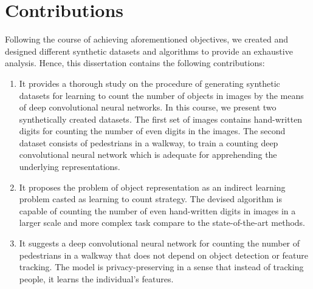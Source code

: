 \section{Contributions}
Following the course of achieving aforementioned objectives, we created and designed different synthetic datasets and algorithms to provide an exhaustive analysis. Hence, this dissertation contains the following contributions: 

\begin{enumerate}
	
	\item It provides a thorough study on the procedure of generating synthetic datasets for learning to count the number of objects in images by the means of deep convolutional neural networks. In this course, we present two synthetically created datasets. The first set of images contains hand-written digits for counting the number of even digits in the images. The second dataset consists of pedestrians in a walkway, to train a counting deep convolutional neural network which is adequate for apprehending the underlying representations.
	
	
	\item It proposes the problem of object representation as an indirect learning problem casted as learning to count strategy. The devised algorithm is capable of counting the number of even hand-written digits in images in a larger scale and more complex task compare to the state-of-the-art methods. 
	
	
	\item It suggests a deep convolutional neural network for counting the number of pedestrians in a walkway that does not depend on object detection or feature tracking. The model is privacy-preserving in a sense that instead of tracking people, it learns the individual's features.
	 


\end{enumerate}
